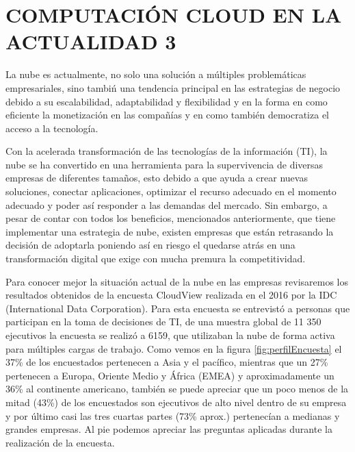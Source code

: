 \documentclass[a4paper, 12pt]{report}
\begin{document}
\chapter{COMPUTACI\'ON CLOUD EN LA ACTUALIDAD 3}
\vspace*{-2em}
\begin{justify}
La nube es actualmente, no solo una soluci\'on a m\'ultiples problem\'aticas empresariales, sino tambi\'n una tendencia principal en las estrategias de negocio debido a su escalabilidad, adaptabilidad y flexibilidad y en la forma en como eficiente la monetizaci\'on en las compa\~n\'ias y en como tambi\'en democratiza el acceso a la tecnolog\'ia.\par

Con la acelerada transformaci\'on de las tecnolog\'ias de la informaci\'on (TI), la nube se ha convertido en una herramienta para la supervivencia de diversas empresas de diferentes tama\~nos, esto debido a que ayuda a crear nuevas soluciones, conectar aplicaciones, optimizar el recurso adecuado en el momento adecuado y poder as\'i responder a las demandas del mercado.
Sin embargo, a pesar de contar con todos los beneficios, mencionados anteriormente, que tiene implementar una estrategia de nube, existen empresas que están retrasando la decisión de adoptarla poniendo as\'i en riesgo el quedarse atr\'as en una transformaci\'on digital que exige con mucha premura la competitividad.\par

Para conocer mejor la situaci\'on actual de la nube en las empresas revisaremos los resultados obtenidos de la encuesta CloudView realizada en el 2016 por la IDC (International Data Corporation). Para esta encuesta se entrevist\'o a personas que participan en la toma de decisiones de TI, de una muestra global de 11 350 ejecutivos la encuesta se realiz\'o a 6159, que utilizaban la nube de forma activa para m\'ultiples cargas de trabajo. Como vemos en la figura \ref{fig:perfilEncuesta} el 37\% de los encuestados pertenecen a Asia y el pac\'ifico, mientras que un 27\% pertenecen a Europa, Oriente Medio y \'Africa (EMEA) y aproximadamente un 36\% al continente americano, tambi\'en se puede apreciar que un poco menos de la mitad (43\%) de los encuestados son ejecutivos de alto nivel dentro de su empresa y por \'ultimo casi las tres cuartas partes (73\% aprox.) pertenec\'ian a medianas y grandes empresas. Al pie podemos apreciar las preguntas aplicadas durante la realizaci\'on de la encuesta.\par


\end{justify}
\end{document}
